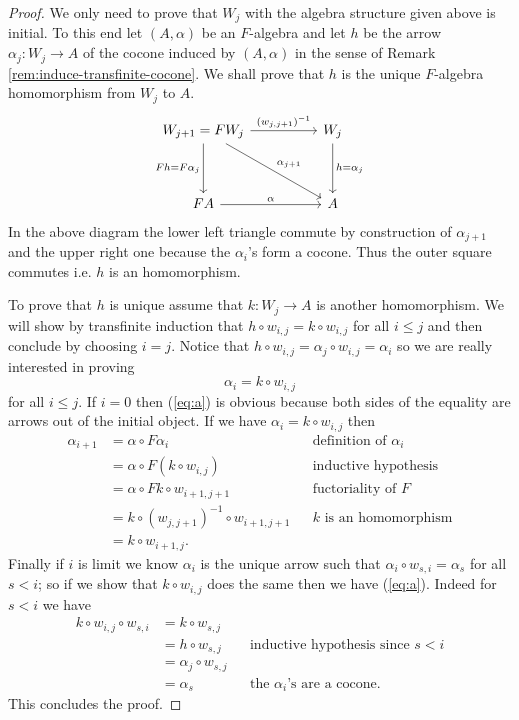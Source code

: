 \documentclass[letterpaper, 11pt, oneside]{memoir}
\theoremstyle{myteo}
\numberwithin{equation}{section}
\begin{document}
\begin{proof}
  We only need to prove that \(W_j\) with the algebra structure given above is initial.
  To this end let \((A, \alpha)\) be an \(F\)-algebra and let \(h\) be the arrow \(\alpha_j : W_j \to A\) of the cocone induced by \((A, \alpha)\) in the sense of Remark \ref{rem:induce-transfinite-cocone}.
  We shall prove that \(h\) is the unique \(F\)-algebra homomorphism from \(W_j\) to \(A\).
  \begin{equation*}
    \begin{tikzcd}[sep=huge]
      W_{j+1} = FW_j \ar[r, "(w_{j,j+1})^{-1}"] \ar[d, "Fh = F\alpha_j"'] \ar[dr, "\alpha_{j+1}"] & W_j \ar[d, "h = \alpha_j"]\\
      FA \ar[r, "\alpha"] & A
    \end{tikzcd}
  \end{equation*}
  In the above diagram the lower left triangle commute by construction of \(\alpha_{j+1}\) and the upper right one because the \(\alpha_i\)'s form a cocone.
  Thus the outer square commutes i.e. \(h\) is an homomorphism.

  To prove that \(h\) is unique assume that \(k : W_j \to A\) is another homomorphism.
  We will show by transfinite induction that \(h \circ w_{i, j} = k \circ w_{i, j}\) for all \(i \leq j\) and then conclude by choosing \(i = j\).
  Notice that \(h \circ w_{i, j} = \alpha_j \circ w_{i, j} = \alpha_i\) so we are really interested in proving
  \begin{equation}
    \label{eq:a}
    \alpha_i = k \circ w_{i, j}
  \end{equation}
  for all \(i \leq j\).
  If \(i = 0\) then (\ref{eq:a}) is obvious because both sides of the equality are arrows out of the initial object.
  If we have \(\alpha_i = k \circ w_{i, j}\) then
  \begin{align*}
    \alpha_{i+1} &= \alpha \circ F\alpha_i && \text{definition of \(\alpha_i\)}\\
            &= \alpha \circ F(k \circ w_{i, j}) && \text{inductive hypothesis}\\
            &= \alpha \circ Fk \circ w_{i+1, j+1} && \text{fuctoriality of \(F\)}\\
            &= k \circ (w_{j,j+1})^{-1} \circ w_{i+1, j+1} && \text{\(k\) is an homomorphism}\\
            &= k \circ w_{i+1, j}.
  \end{align*}
  Finally if \(i\) is limit we know \(\alpha_i\) is the unique arrow such that \(\alpha_i \circ w_{s,i} = \alpha_s\) for all \(s < i\); so if we show that \(k \circ w_{i, j}\) does the same then we have (\ref{eq:a}).
  Indeed for \(s < i\) we have
  \begin{align*}
    k \circ w_{i, j} \circ w_{s, i} &= k \circ w_{s, j} && \\
                            &= h \circ w_{s, j} && \text{inductive hypothesis since \(s < i\)}\\
                            &= \alpha_j \circ w_{s, j} && \\
                            &= \alpha_s && \text{the \(\alpha_i\)'s are a cocone}.
  \end{align*}
  This concludes the proof.
\end{proof}
\end{document}
